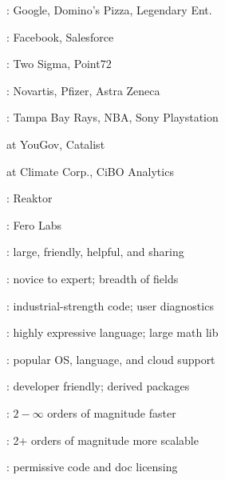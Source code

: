 \documentclass[10pt]{report}
\begin{document}
\begin{subitemize}
\item {}: Google, Domino's Pizza, Legendary Ent.
\item {}: Facebook, Salesforce
\item {}: Two Sigma, Point72
\item {}: Novartis, Pfizer, Astra Zeneca
\item {}: Tampa Bay Rays, NBA, Sony Playstation
\item {} at YouGov, Catalist
\item {} at Climate Corp., CiBO Analytics
\item {}: Reaktor
\item {}: Fero Labs
\end{subitemize}


\begin{subitemize}
\item {}: large, friendly, helpful, and sharing
\item {}:  novice to expert; breadth of fields
\item {}:  industrial-strength code; user diagnostics
\item {}:  highly expressive language;  large math lib
\item {}: popular OS, language, and cloud support
\item {}: developer friendly; derived packages
\item {}:  $2-\infty$ orders of magnitude faster
\item {}:  2+ orders of magnitude more scalable
\item {}: permissive code and doc licensing
\end{subitemize}


\end{document}

